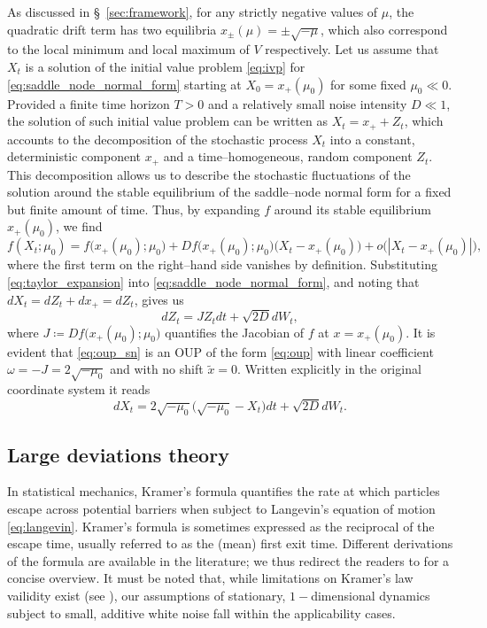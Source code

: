 As discussed in \S~\ref{sec:framework}, for any strictly negative values of $\mu$, the quadratic drift term has two equilibria $x_{\pm}(\mu)=\pm\sqrt{-\mu}$, which also correspond to the local minimum and local maximum of $V$ respectively.
Let us assume that $X_t$ is a solution of the initial value problem \eqref{eq:ivp} for \eqref{eq:saddle_node_normal_form} starting at $X_0 = x_+(\mu_0)$ for some fixed $\mu_0\ll0$.
Provided a finite time horizon $T>0$ and a relatively small noise intensity $D\ll1$, the solution of such initial value problem can be written as $X_t = x_+ + Z_t$, which accounts to the decomposition of the stochastic process $X_t$ into a constant, deterministic component $x_+$ and a time--homogeneous, random component $Z_t$.
This decomposition allows us to describe the stochastic fluctuations of the solution around the stable equilibrium of the saddle--node normal form for a fixed but finite amount of time.
Thus, by expanding $f$ around its stable equilibrium $x_+(\mu_0)$, we find
%
\begin{equation}\label{eq:taylor_expansion}
  f(X_t;\mu_0) = f\bigl(x_+(\mu_0);\mu_0\bigr) + Df\bigl(x_+(\mu_0);\mu_0\bigr)\bigl(X_t - x_+(\mu_0)\bigr) + o\bigr(|X_t - x_+(\mu_0)|\bigr),
\end{equation}
%
where the first term on the right--hand side vanishes by definition.
Substituting \eqref{eq:taylor_expansion} into \eqref{eq:saddle_node_normal_form}, and noting that $dX_t = dZ_t + dx_+ = dZ_t$, gives us
%
\begin{equation}\label{eq:oup_sn}
  dZ_t = JZ_tdt + \sqrt{2D}dW_t,
\end{equation}
%
where $J\coloneqq Df\bigl(x_+(\mu_0);\mu_0\bigr)$ quantifies the Jacobian of $f$ at $x=x_+(\mu_0)$.
It is evident that \eqref{eq:oup_sn} is an OUP of the form \eqref{eq:oup} with linear coefficient $\omega = -J = 2\sqrt{-\mu_0}$ and with no shift $\tilde{x} = 0$.
Written explicitly in the original coordinate system it reads
%
\begin{equation}\label{eq:shifted_oup_sn}
  dX_t = 2\sqrt{-\mu_0}\bigl(\sqrt{-\mu_0} - X_t\bigr)dt + \sqrt{2D}dW_t.
\end{equation}
%

\subsection{Large deviations theory}\label{subsec:ldt}
In statistical mechanics, Kramer's formula quantifies the rate at which particles escape across potential barriers when subject to Langevin's equation of motion \eqref{eq:langevin}.
Kramer's formula is sometimes expressed as the reciprocal of the escape time, usually referred to as the (mean) first exit time.
Different derivations of the formula are available in the literature; we thus redirect the readers to \cite{Berglund2013} for a concise overview.
It must be noted that, while limitations on Kramer's law vailidity exist (see \cite{Berglund2013}), our assumptions of stationary, $1-$dimensional dynamics subject to small, additive white noise fall within the applicability cases.
 
